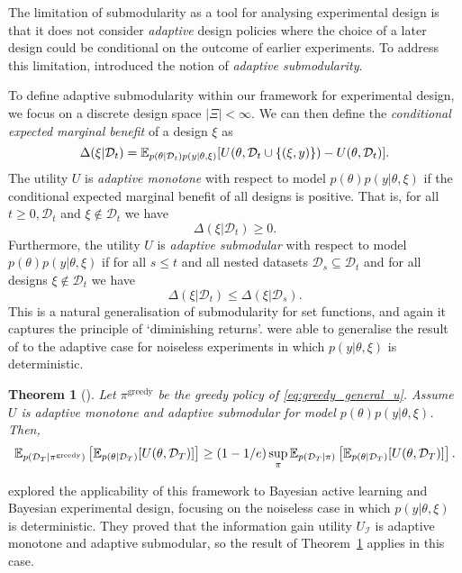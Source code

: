 \documentclass[a4paper, 10pt]{report}
\theoremstyle{plain}
\newtheorem{theorem}{Theorem}
\begin{document}
	The limitation of submodularity as a tool for analysing experimental design is that it does not consider \emph{adaptive} design policies where the choice of a later design could be conditional on the outcome of earlier experiments.
	To address this limitation, \citet{golovin2011adaptive} introduced the notion of \emph{adaptive submodularity}.
	
	To define adaptive submodularity within our framework for experimental design, %
	we focus on a discrete design space $|\Xi|<\infty$.
	We can then define the \emph{conditional expected marginal benefit} of a design $\xi$ as
	\begin{equation}
	\Delta(\xi|\mathcal{D}_t) = \mathbb{E}_{p(\theta|\mathcal{D}_t)p(y|\theta,\xi)}[U(\theta,\mathcal{D}_t \cup \{ (\xi,y) \}) - U(\theta,\mathcal{D}_t)].
	\end{equation}
	The utility $U$ is \emph{adaptive monotone} with respect to model $p(\theta)p(y|\theta,\xi)$ if the conditional expected marginal benefit of all designs is positive. That is, for all $t\ge 0, \mathcal{D}_t$ and $\xi\not\in\mathcal{D}_t$ we have 
	\begin{equation}
	\Delta(\xi|\mathcal{D}_t) \ge 0.
	\end{equation}
	Furthermore, the utility $U$ is \emph{adaptive submodular} with respect to model $p(\theta)p(y|\theta,\xi)$ if for all $s \le t$ and all nested datasets $\mathcal{D}_s \subseteq \mathcal{D}_t$ and for all designs $\xi \not\in \mathcal{D}_t$ we have
	\begin{equation}
	\Delta(\xi|\mathcal{D}_t) \le \Delta(\xi|\mathcal{D}_s).
	\end{equation}
	This is a natural generalisation of submodularity for set functions, and again it captures the principle of `diminishing returns'.
	\citet{golovin2011adaptive} were able to generalise the result of \citet{nemhauser1978analysis} to the adaptive case for noiseless experiments in which $p(y|\theta,\xi)$ is deterministic.
	\begin{theorem}[\citet{golovin2011adaptive}]
		\label{thm:adaptive_submodular}
		Let $\pi^\text{greedy}$ be the greedy policy of \eqref{eq:greedy_general_u}. Assume $U$ is adaptive monotone and adaptive submodular for model $p(\theta)p(y|\theta,\xi)$.
		Then,
		\begin{equation}
		\mathbb{E}_{p(\mathcal{D}_T|\pi^\text{greedy})}\left[ \mathbb{E}_{p(\theta|\mathcal{D}_T)}[U(\theta,\mathcal{D}_T)] \right] \ge \left(1 - 1/e \right)\sup_\pi \mathbb{E}_{p(\mathcal{D}_T|\pi)}\left[ \mathbb{E}_{p(\theta|\mathcal{D}_T)}[U(\theta,\mathcal{D}_T)] \right].
		\end{equation}
	\end{theorem}
	\citet{golovin2010} explored the applicability of this framework to Bayesian active learning and Bayesian experimental design, focusing on the noiseless case in which $p(y|\theta,\xi)$ is deterministic.
	They proved that the information gain utility $U_\mathcal{I}$ is adaptive monotone and adaptive submodular, so the result of Theorem~\ref{thm:adaptive_submodular} applies in this case.
	
\end{document}
